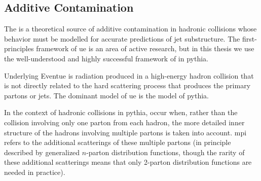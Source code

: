 \begin{subappendices}
\subsection{Additive Contamination}
\label{app:additive-contamination}


The  is a theoretical source of additive contamination in hadronic collisions whose behavior must be modelled for accurate predictions of jet substructure.
%
The first-principles framework of \gls{ue} is an area of active research, but in this thesis we use the well-understood and highly successful framework of \textit{} in \gls{pythia}.

\begin{definitionbox}{Underlying Event}{ue}
     is radiation produced in a high-energy hadron collision that is not directly related to the hard scattering process that produces the primary partons or jets.
    The dominant model of \gls{ue} is the  model of \gls{pythia}.

    In the context of hadronic collisions in \gls{pythia},  occur when, rather than the collision involving only one parton from each hadron, the more detailed inner structure of the hadrons involving multiple partons is taken into account.
    \gls{mpi} refers to the additional scatterings of these multiple partons (in principle described by generalized \(n\)-parton distribution functions, though the rarity of these additional scatterings means that only 2-parton distribution functions are needed in practice).
\end{definitionbox}






\end{subappendices}
